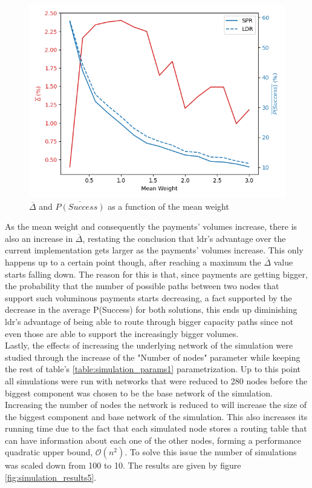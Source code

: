 \begin{figure}[H]
\begin{center}
  \includegraphics[width=\linewidth]{images/simulation_results4.png}
  \caption{$\overline{\Delta}$ and  $\overline{P(Success)}$ as a function of the mean weight}
  \label{fig:simulation_results4}
  \end{center}
\end{figure}

As the mean weight and consequently the payments' volumes increase, there is also an increase in $\overline{\Delta}$, restating the conclusion that \acrshort{ldr}'s advantage over the current implementation gets larger as the payments' volumes increase. This only happens up to a certain point though, after reaching a maximum the $\overline{\Delta}$ value starts falling down. The reason for this is that, since payments are getting bigger, the probability that the number of possible paths between two nodes that support such voluminous payments starts decreasing, a fact supported by the decrease in the average P(Success) for both solutions, this ends up diminishing \acrshort{ldr}'s advantage of being able to route through bigger capacity paths since not even those are able to support  the increasingly bigger volumes.\\
Lastly, the effects of increasing the underlying network of the simulation were studied through the increase of the "Number of nodes" parameter while keeping the rest of table's \ref{table:simulation_params1} parametrization. Up to this point all simulations were run with networks that were reduced to 280 nodes before the biggest component was chosen to be the base network of the simulation. Increasing the number of nodes the network is reduced to will increase the size of the biggest component and base network of the simulation. This also increases its running time due to the fact that each simulated node stores a routing table that can have information about each one of the other nodes, forming a performance quadratic upper bound, $\mathcal{O}(n^2)$. To solve this issue the number of simulations was scaled down from 100 to 10. The  results are given by figure \ref{fig:simulation_results5}.\\

